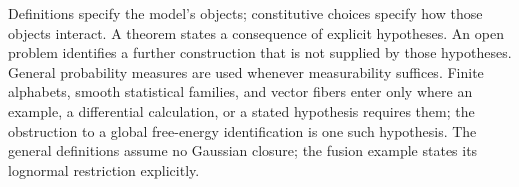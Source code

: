 Definitions specify the model's objects; constitutive choices specify how those objects interact. A theorem states a consequence of explicit hypotheses. An open problem identifies a further construction that is not supplied by those hypotheses. General probability measures are used whenever measurability suffices. Finite alphabets, smooth statistical families, and vector fibers enter only where an example, a differential calculation, or a stated hypothesis requires them; the obstruction to a global free-energy identification is one such hypothesis. The general definitions assume no Gaussian closure; the fusion example states its lognormal restriction explicitly.
